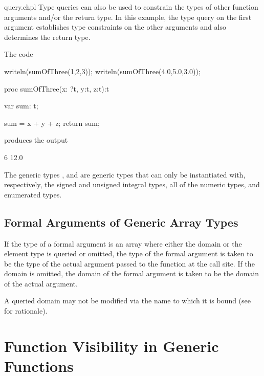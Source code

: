 \begin{chapelexample}{query.chpl}
Type queries can also be used to constrain the types of other function arguments
and/or the return type.  In this example, the type query on the first argument
establishes type constraints on the other arguments and also determines the
return type.

The code
\begin{chapel}
writeln(sumOfThree(1,2,3));
writeln(sumOfThree(4.0,5.0,3.0));

proc sumOfThree(x: ?t, y:t, z:t):t {
   var sum: t;
   
   sum = x + y + z;
   return sum;
}
\end{chapel}
produces the output
\begin{chapelprintoutput}{}
6
12.0
\end{chapelprintoutput}
\end{chapelexample}

The generic types ,  and 
are generic types that can only be instantiated with, respectively, the
signed and unsigned integral types, all of the numeric types, and
enumerated types.

\subsection{Formal Arguments of Generic Array Types}
\label{Formal_Arguments_of_Generic_Array_Types}

If the type of a formal argument is an array where either the domain
or the element type is queried or omitted, the type of the formal
argument is taken to be the type of the actual argument passed to the
function at the call site.  If the domain is omitted, the domain of
the formal argument is taken to be the domain of the actual argument.

A queried domain may not be modified via the name to which it is bound
(see~ for rationale).

\section{Function Visibility in Generic Functions}
\label{Function_Visibility_in_Generic_Functions}

